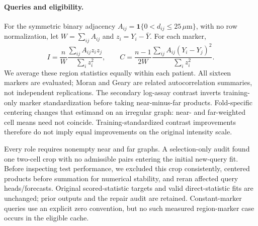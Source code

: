 \documentclass[10pt,letterpaper]{article}
\theoremstyle{definition}
\theoremstyle{remark}
\begin{document}
\paragraph{Queries and eligibility.} For the symmetric binary adjacency $A_{ij}=\mathbf{1}\{0<d_{ij}\le25\,\mu\mathrm{m}\}$, with no row normalization, let $W=\sum_{ij}A_{ij}$ and $z_i=Y_i-\bar Y$. For each marker,
\[
I=\frac{n}{W}\frac{\sum_{ij}A_{ij}z_iz_j}{\sum_i z_i^2},\qquad
C=\frac{n-1}{2W}\frac{\sum_{ij}A_{ij}(Y_i-Y_j)^2}{\sum_i z_i^2}.
\]
We average these region statistics equally within each patient. All sixteen markers are evaluated; Moran and Geary are related autocorrelation summaries, not independent replications. The secondary log-assay contrast inverts training-only marker standardization before taking near-minus-far products. Fold-specific centering changes that estimand on an irregular graph: near- and far-weighted cell means need not coincide. Training-standardized contrast improvements therefore do not imply equal improvements on the original intensity scale.

Every role requires nonempty near and far graphs. A selection-only audit found one two-cell crop with no admissible pairs entering the initial new-query fit. Before inspecting test performance, we excluded this crop consistently, centered products before summation for numerical stability, and reran affected query heads/forecasts. Original scored-statistic targets and valid direct-statistic fits are unchanged; prior outputs and the repair audit are retained. Constant-marker queries use an explicit zero convention, but no such measured region-marker case occurs in the eligible cache.

\begin{table}[!htp]
\centering
\caption{New-query point error relative to each query's plug-in, three seeds and all 40 patients. Smaller is better. $^\dagger$Post hoc (Appendix~\ref{app:simple}). Adapted methods jointly learn 48 outputs from existing paired training assays. Frozen methods use no new-query labels for point fitting (separate measured calibration remains necessary for intervals). Moment ratios approximate expectations of ratios; log-assay moments are bilinear and integrated exactly.}
\label{tab:querytransfer}

\end{table}
\end{document}

